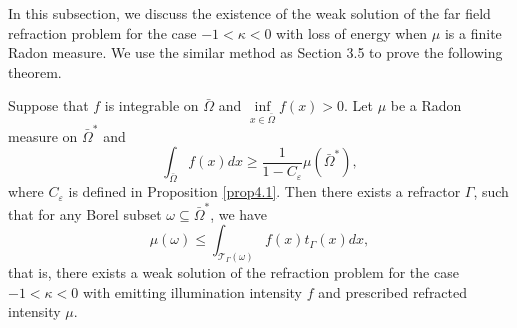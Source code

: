 \documentclass[a4paper,12pt,]{article}
\newtheorem{theorem}{\hskip\parindent\bf Theorem}[section]%
\numberwithin{equation}{section}
\numberwithin{equation}{section} \allowdisplaybreaks
\begin{document}
In this subsection, we discuss the existence of the weak solution of the far field refraction problem for the case $-1 < \kappa <0$ with loss of energy when $\mu$ is a finite Radon measure. We use the similar method as Section 3.5 to prove the following theorem.

\begin{theorem}
  Suppose that $f$ is integrable on $\bar{\Omega}$ and $\inf\limits_{x\in \bar{\Omega}}f(x)>0$. Let $\mu$ be a Radon measure on $\bar{\Omega}^{\ast}$ and
  \begin{equation}\label{4.14}
    \int_{\bar{\Omega}}f(x)dx \geq \frac{1}{1 - C_{\varepsilon}}\mu(\bar{\Omega}^{\ast}),
  \end{equation}
  where $C_{\varepsilon}$ is defined in Proposition \ref{prop4.1}. Then there exists a refractor $\Gamma$, such that for any Borel subset $\omega \subseteq \bar{\Omega}^{\ast}$, we have
  $$\mu(\omega) \leq \int_{\mathcal{T}_{\Gamma}(\omega)}f(x)t_{\Gamma}(x)dx,$$
  that is, there exists a weak solution of the refraction problem for the case $-1 <\kappa < 0$ with emitting illumination intensity $f$ and prescribed refracted intensity $\mu$.
  \label{thm4.3}
\end{theorem}
\end{document}
